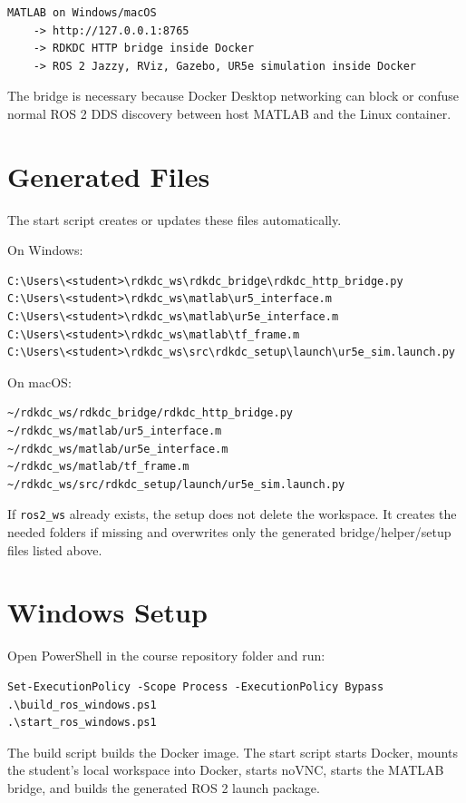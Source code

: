 \documentclass[11pt]{article}
\begin{document}
\begin{Verbatim}
MATLAB on Windows/macOS
    -> http://127.0.0.1:8765
    -> RDKDC HTTP bridge inside Docker
    -> ROS 2 Jazzy, RViz, Gazebo, UR5e simulation inside Docker
\end{Verbatim}

The bridge is necessary because Docker Desktop networking can block or confuse normal ROS 2 DDS discovery between host MATLAB and the Linux container.

\section*{Generated Files}

The start script creates or updates these files automatically.

On Windows:

\begin{Verbatim}
C:\Users\<student>\rdkdc_ws\rdkdc_bridge\rdkdc_http_bridge.py
C:\Users\<student>\rdkdc_ws\matlab\ur5_interface.m
C:\Users\<student>\rdkdc_ws\matlab\ur5e_interface.m
C:\Users\<student>\rdkdc_ws\matlab\tf_frame.m
C:\Users\<student>\rdkdc_ws\src\rdkdc_setup\launch\ur5e_sim.launch.py
\end{Verbatim}

On macOS:

\begin{Verbatim}
~/rdkdc_ws/rdkdc_bridge/rdkdc_http_bridge.py
~/rdkdc_ws/matlab/ur5_interface.m
~/rdkdc_ws/matlab/ur5e_interface.m
~/rdkdc_ws/matlab/tf_frame.m
~/rdkdc_ws/src/rdkdc_setup/launch/ur5e_sim.launch.py
\end{Verbatim}

If \texttt{ros2\_ws} already exists, the setup does not delete the workspace. It creates the needed folders if missing and overwrites only the generated bridge/helper/setup files listed above.

\section*{Windows Setup}

Open PowerShell in the course repository folder and run:

\begin{Verbatim}
Set-ExecutionPolicy -Scope Process -ExecutionPolicy Bypass
.\build_ros_windows.ps1
.\start_ros_windows.ps1
\end{Verbatim}

The build script builds the Docker image. The start script starts Docker, mounts the student's local workspace into Docker, starts noVNC, starts the MATLAB bridge, and builds the generated ROS 2 launch package.
\end{document}
